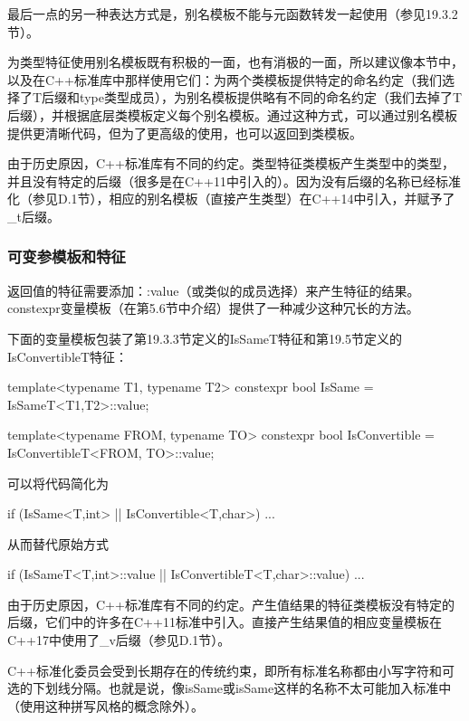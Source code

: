 最后一点的另一种表达方式是，别名模板不能与元函数转发一起使用（参见19.3.2节）。

为类型特征使用别名模板既有积极的一面，也有消极的一面，所以建议像本节中，以及在C++标准库中那样使用它们：为两个类模板提供特定的命名约定（我们选择了T后缀和type类型成员），为别名模板提供略有不同的命名约定（我们去掉了T后缀），并根据底层类模板定义每个别名模板。通过这种方式，可以通过别名模板提供更清晰代码，但为了更高级的使用，也可以返回到类模板。

由于历史原因，C++标准库有不同的约定。类型特征类模板产生类型中的类型，并且没有特定的后缀（很多是在C++11中引入的）。因为没有后缀的名称已经标准化（参见D.1节），相应的别名模板（直接产生类型）在C++14中引入，并赋予了\_t后缀。

\subsubsection{可变参模板和特征}

返回值的特征需要添加：:value（或类似的成员选择）来产生特征的结果。constexpr变量模板（在第5.6节中介绍）提供了一种减少这种冗长的方法。

下面的变量模板包装了第19.3.3节定义的IsSameT特征和第19.5节定义的IsConvertibleT特征：

\begin{cpp}
template<typename T1, typename T2>
	constexpr bool IsSame = IsSameT<T1,T2>::value;
	
template<typename FROM, typename TO>
	constexpr bool IsConvertible = IsConvertibleT<FROM, TO>::value;
\end{cpp}

可以将代码简化为

\begin{cpp}
if (IsSame<T,int> || IsConvertible<T,char>) ...
\end{cpp}

从而替代原始方式

\begin{cpp}
if (IsSameT<T,int>::value || IsConvertibleT<T,char>::value) ...
\end{cpp}

由于历史原因，C++标准库有不同的约定。产生值结果的特征类模板没有特定的后缀，它们中的许多在C++11标准中引入。直接产生结果值的相应变量模板在C++17中使用了\_v后缀（参见D.1节）。

\begin{notice}
C++标准化委员会受到长期存在的传统约束，即所有标准名称都由小写字符和可选的下划线分隔。也就是说，像isSame或isSame这样的名称不太可能加入标准中（使用这种拼写风格的概念除外）。
\end{notice}





